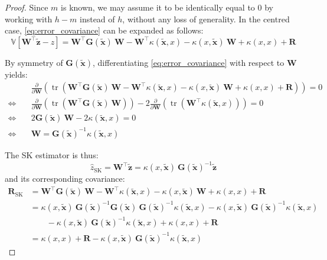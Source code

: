 \begin{proof}
	Since $m$ is known, we may assume it to be identically equal to $0$ by working with $h-m$ instead of $h$, without any loss of generality. In the centred case, \eqref{eq:error_covariance} can be expanded as follows:
	\begin{equation}
		\mathbb{V}[\mathbf{W}^\top\tilde{\mathbf{z}}-z]=\mathbf{W}^\top \mathbf{G}(\tilde{\mathbf{x}})\:\mathbf{W}-\mathbf{W}^\top \kappa(\tilde{\mathbf{x}},x)-\kappa(x,\tilde{\mathbf{x}})\:\mathbf{W}+\kappa(x,x)+\mathbf{R}\label{eq:generic_kriging_variance}
	\end{equation}

	By symmetry of $\mathbf{G}(\tilde{\mathbf{x}})$, differentiating \eqref{eq:error_covariance} with respect to $\mathbf{W}$ yields:
	\begin{equation}
		\begin{aligned}
		&\frac{\partial}{\partial \mathbf{W}}\left(\operatorname{tr}\left(\mathbf{W}^\top \mathbf{G}(\tilde{\mathbf{x}})\:\mathbf{W}-\mathbf{W}^\top \kappa(\tilde{\mathbf{x}},x)-\kappa(x,\tilde{\mathbf{x}})\:\mathbf{W}+\kappa(x,x)+\mathbf{R}\right)\right)=0\\
		\iff\quad&\frac{\partial}{\partial \mathbf{W}}\left(\operatorname{tr}\left(\mathbf{W}^\top \mathbf{G}(\tilde{\mathbf{x}})\:\mathbf{W}\right)\right)-2\frac{\partial}{\partial \mathbf{W}}\left(\operatorname{tr}\left(\mathbf{W}^\top \kappa(\tilde{\mathbf{x}},x)\right)\right)=0\\
		\iff\quad&2\mathbf{G}(\tilde{\mathbf{x}})\:\mathbf{W}-2\kappa(\tilde{\mathbf{x}},x)=0\\
		\iff\quad&\mathbf{W}=\mathbf{G}(\tilde{\mathbf{x}})^{-1}\kappa(\tilde{\mathbf{x}},x)
		\end{aligned}
	\end{equation}

	The SK estimator is thus:
	\begin{equation}
		\hat{z}_{\mathrm{SK}}=\mathbf{W}^\top\tilde{\mathbf{z}}=\kappa(x,\tilde{\mathbf{x}})\:\mathbf{G}(\tilde{\mathbf{x}})^{-1}\tilde{\mathbf{z}}
	\end{equation}
	and its corresponding covariance:
	\begin{equation}
		\begin{aligned}
		\mathbf{R}_{\mathrm{SK}}&=\mathbf{W}^\top \mathbf{G}(\tilde{\mathbf{x}})\:\mathbf{W}-\mathbf{W}^\top \kappa(\tilde{\mathbf{x}},x)-\kappa(x,\tilde{\mathbf{x}})\:\mathbf{W}+\kappa(x,x)+\mathbf{R}\\
		&=\kappa(x,\tilde{\mathbf{x}})\:\mathbf{G}(\tilde{\mathbf{x}})^{-1}\mathbf{G}(\tilde{\mathbf{x}})\:\mathbf{G}(\tilde{\mathbf{x}})^{-1}\kappa(\tilde{\mathbf{x}},x)-\kappa(x,\tilde{\mathbf{x}})\:\mathbf{G}(\tilde{\mathbf{x}})^{-1}\kappa(\tilde{\mathbf{x}},x)\\
		&\qquad-\kappa(x,\tilde{\mathbf{x}})\:\mathbf{G}(\tilde{\mathbf{x}})^{-1}\kappa(\tilde{\mathbf{x}},x)+\kappa(x,x)+\mathbf{R}\\
		&=\kappa(x,x)+\mathbf{R}-\kappa(x,\tilde{\mathbf{x}})\:\mathbf{G}(\tilde{\mathbf{x}})^{-1}\kappa(\tilde{\mathbf{x}},x)
		\end{aligned}
	\end{equation}


\end{proof}
